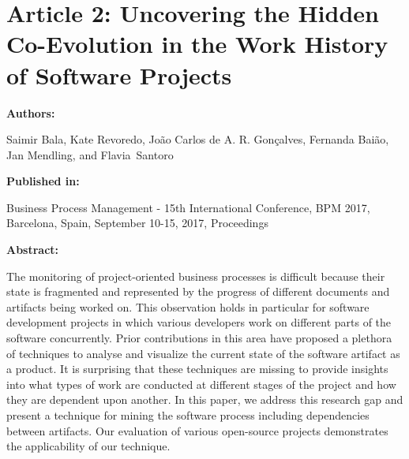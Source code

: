 \chapter{Article 2: Uncovering the Hidden Co-Evolution in the Work History of Software Projects}
\label{chap:articleA2}

{\bfseries \Large Authors:}

\noindent Saimir Bala, Kate Revoredo, 
Jo\~{a}o Carlos de A. R. Gon\c{c}alves,
Fernanda Bai\~{a}o,
Jan Mendling, and Flavia~Santoro \hfill

\bigskip

{\noindent\bfseries \Large Published in: \medskip}

\noindent Business Process Management - 15th International Conference, {BPM}
2017, Barcelona, Spain, September 10-15, 2017, Proceedings

\bigskip

{\noindent\bfseries \Large Abstract: \medskip}


\noindent The monitoring of project-oriented business processes is difficult because their state is fragmented and represented by the progress of different documents and artifacts being worked on. This observation holds in particular for software development projects in which various developers work on different parts of the software concurrently. Prior contributions in this area have proposed a plethora of techniques to analyse and visualize the current state of the software artifact as a product. It is surprising that these techniques are missing to provide insights into what types of work are conducted at different stages of the project and how they are dependent upon another. In this paper, we address this research gap and present a technique for mining the software process including dependencies between artifacts. Our evaluation of various open-source projects demonstrates the applicability of our technique. 


\pagebreak





